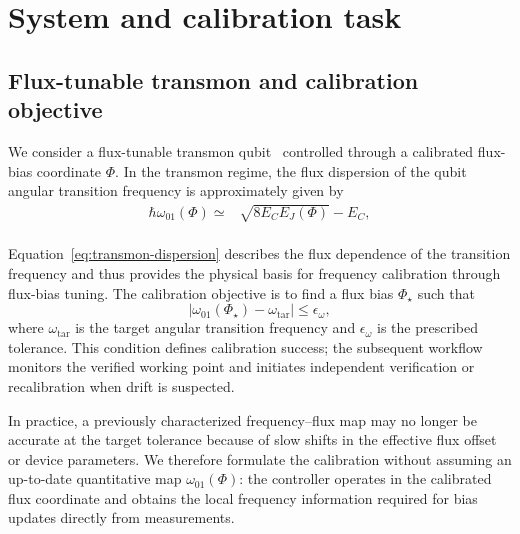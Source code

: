 ﻿\section{System and calibration task}
\label{sec:system}

\subsection{Flux-tunable transmon and calibration objective}
\label{sec:system-objective}

We consider a flux-tunable transmon qubit~\cite{krantz2019quantum} controlled through a calibrated flux-bias coordinate $\Phi$. 
In the transmon regime, the flux dispersion of the qubit angular transition frequency is approximately given by~\cite{koch2007charge}
%
\begin{equation}
\begin{split}
\hbar\omega_{01}(\Phi)
\simeq{}&
\sqrt{8E_CE_J(\Phi)}-E_C, \\
\label{eq:transmon-dispersion}
\end{split}
\end{equation}

Equation~\eqref{eq:transmon-dispersion} describes the flux dependence of the
transition frequency and thus provides the physical basis for frequency
calibration through flux-bias tuning. The calibration objective is to find a
flux bias $\Phi_\star$ such that
%
\begin{equation}
\left|\omega_{01}(\Phi_\star)-\omega_{\mathrm{tar}}\right|
\leq \epsilon_\omega,
\label{eq:calibration-success}
\end{equation}
%
where $\omega_{\mathrm{tar}}$ is the target angular transition frequency and
$\epsilon_\omega$ is the prescribed tolerance. This condition defines calibration success; the subsequent workflow monitors
the verified working point and initiates independent verification or
recalibration when drift is suspected.

In practice, a previously characterized frequency--flux map may no longer be
accurate at the target tolerance because of slow shifts in the effective flux
offset or device parameters\cite{paladino2014noise,vepsalainen2022improving}. We therefore formulate the calibration without
assuming an up-to-date quantitative map $\omega_{01}(\Phi)$: the controller
operates in the calibrated flux coordinate and obtains the local frequency
information required for bias updates directly from measurements.

